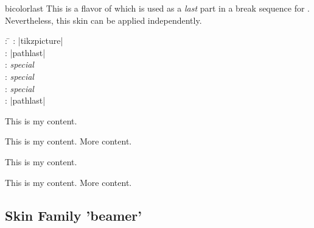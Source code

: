 \clearpage
\begin{docSkin}{bicolorlast}
This is a flavor of  which is used as a \emph{last} part
in a break sequence for .
Nevertheless, this skin can be applied independently.
\begin{tcolorbox}[skintable=bicolorlast]
  \begin{tabbing}
    : \=\kill
    :  \> |tikzpicture|\\ 
    :           \> |pathlast|\\
    : \> \emph{special}\\ 
    :        \> \emph{special}\\
    :    \> \emph{special}\\
    :           \> |pathlast|
  \end{tabbing}
\end{tcolorbox}
\end{docSkin}


\begin{dispExample}
\begin{tcbraster}[skin=bicolorlast,raster equal height,raster columns=4,
    colback=LightGreen,colframe=DarkGreen,colbacklower=LimeGreen!75!LightGreen,
    colbacktitle=LimeGreen!75!DarkGreen,
    left=1mm,right=1mm,top=1mm,bottom=1mm,middle=1mm]
  \begin{tcolorbox}
    This is my content.
  \end{tcolorbox}
  \begin{tcolorbox}
    This is my content.
    \tcblower
    More content.
  \end{tcolorbox}
  \begin{tcolorbox}[adjusted title=My title]
    This is my content.
  \end{tcolorbox}
  \begin{tcolorbox}[adjusted title=My title]
    This is my content.
    \tcblower
    More content.
  \end{tcolorbox}
\end{tcbraster}
\end{dispExample}



\clearpage
\subsection{Skin Family 'beamer'}

